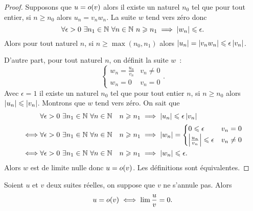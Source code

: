 \begin{proof}
  Supposons que \(u = o\mathopen{}\left(v\right)\) alors il existe un naturel \(n_0\) tel que 
  pour tout entier, si \(n \geqslant n_0\) alors \(u_n = v_n w_n\). La suite 
  \(w\) tend vers zéro donc
  \begin{equation}
    \forall \epsilon > 0 \ \exists n_1 \in \mathbb{N} \ \forall n \in \mathbb{N} \ n \geqslant 
    n_1 \implies \left\lvert w_n\right\rvert \leqslant \epsilon.
  \end{equation}
  Alors pour tout naturel \(n\), si \(n \geqslant \max(n_0, n_1)\) alors 
  \(\left\lvert u_n\right\rvert = \left\lvert v_n w_n\right\rvert \leqslant \epsilon \left\lvert v_n\right\rvert\).

  D'autre part, pour tout naturel \(n\), on définit la suite \(w\)~:
  \begin{equation}
    \begin{cases} w_n = \frac{u_n}{v_n} & v_n \neq 0 \\ w_n = 0 & v_n = 
    0\end{cases}.
    \end{equation}
    Avec \(\epsilon = 1\) il existe un naturel \(n_0\) tel que pour tout entier 
    \(n\), si \(n \geqslant n_0\) alors \(\left\lvert u_n\right\rvert \leqslant \left\lvert v_n\right\rvert\). 
    Montrons que \(w\) tend vers zéro. On sait que
    \begin{align}
    & \forall \epsilon > 0 \ \exists n_1 \in \N \ \forall n \in \N \quad n 
      \geqslant n_1 \implies \abs{u_n} \leqslant \epsilon \abs{v_n} \\ \iff & 
      \forall \epsilon > 0 \ \exists n_1 \in \N \ \forall n \in \N \quad n 
      \geqslant n_1 \implies \abs{w_n}= \begin{cases} 0 \leqslant \epsilon & v_n 
      = 0 \\ \abs{\frac{u_n}{v_n}} \leqslant \epsilon & v_n\neq 0 \end{cases} \\
        \iff & \forall \epsilon > 0 \ \exists n_1 \in \N \ \forall n \in \N 
        \quad n \geqslant n_1 \implies \abs{w_n} \leqslant \epsilon.
      \end{align}
      Alors \(w\) est de limite nulle donc \(u = o\mathopen{}\left(v\right)\). Les définitions 
      sont équivalentes.
    \end{proof}
    \begin{prop}
      Soient \(u\) et \(v\) deux suites réelles, on suppose que \(v\) ne 
      s'annule pas. Alors
      \begin{equation}
        u = o\mathopen{}\left(v\right) \iff \lim \frac{u}{v} = 0.
      \end{equation}
    \end{prop}
